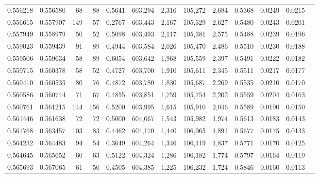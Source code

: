 \begin{tabular}{rrrrrrrrrrrrr}
0.556218 & 0.556580 &    68 &    88 &                                     0.5641 & 603,294 &   2,316 & 105,272 &   2,684 & 0.5368 & 0.0249 & 0.0215 \\
0.556615 & 0.557907 &   149 &    57 &                                     0.2767 & 603,443 &   2,167 & 105,329 &   2,627 & 0.5480 & 0.0243 & 0.0201 \\
0.557949 & 0.558979 &    50 &    52 &                                     0.5098 & 603,493 &   2,117 & 105,381 &   2,575 & 0.5488 & 0.0239 & 0.0196 \\
0.559023 & 0.559439 &    91 &    89 &                                     0.4944 & 603,584 &   2,026 & 105,470 &   2,486 & 0.5510 & 0.0230 & 0.0188 \\
0.559506 & 0.559634 &    58 &    89 &                                     0.6054 & 603,642 &   1,968 & 105,559 &   2,397 & 0.5491 & 0.0222 & 0.0182 \\
0.559715 & 0.560378 &    58 &    52 &                                     0.4727 & 603,700 &   1,910 & 105,611 &   2,345 & 0.5511 & 0.0217 & 0.0177 \\
0.560410 & 0.560535 &    80 &    76 &                                     0.4872 & 603,780 &   1,830 & 105,687 &   2,269 & 0.5535 & 0.0210 & 0.0170 \\
0.560586 & 0.560744 &    71 &    67 &                                     0.4855 & 603,851 &   1,759 & 105,754 &   2,202 & 0.5559 & 0.0204 & 0.0163 \\
0.560761 & 0.561215 &   144 &   156 &                                     0.5200 & 603,995 &   1,615 & 105,910 &   2,046 & 0.5589 & 0.0190 & 0.0150 \\
0.561446 & 0.561638 &    72 &    72 &                                     0.5000 & 604,067 &   1,543 & 105,982 &   1,974 & 0.5613 & 0.0183 & 0.0143 \\
0.561768 & 0.563457 &   103 &    83 &                                     0.4462 & 604,170 &   1,440 & 106,065 &   1,891 & 0.5677 & 0.0175 & 0.0133 \\
0.564232 & 0.564483 &    94 &    54 &                                     0.3649 & 604,264 &   1,346 & 106,119 &   1,837 & 0.5771 & 0.0170 & 0.0125 \\
0.564645 & 0.565652 &    60 &    63 &                                     0.5122 & 604,324 &   1,286 & 106,182 &   1,774 & 0.5797 & 0.0164 & 0.0119 \\
0.565693 & 0.567065 &    61 &    50 &                                     0.4505 & 604,385 &   1,225 & 106,232 &   1,724 & 0.5846 & 0.0160 & 0.0113 \\

\end{tabular}
